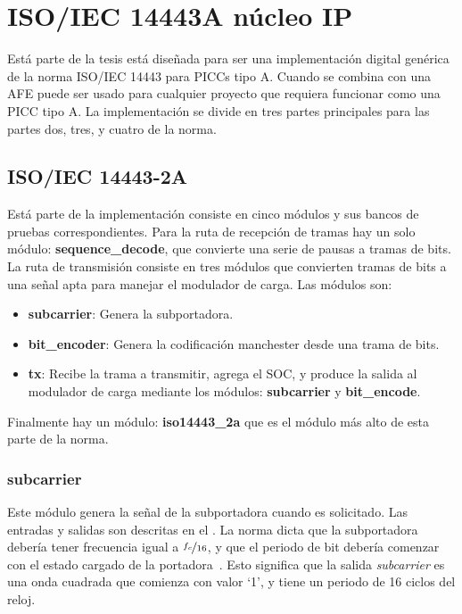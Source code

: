 \documentclass[a4paper, twoside, 11pt]{report}
\begin{document}
\FloatBarrier
\section{ISO/IEC 14443A núcleo IP}

Está parte de la tesis está diseñada para ser una implementación digital genérica de la norma ISO/IEC 14443 para PICCs tipo A. Cuando se combina con una AFE puede ser usado para cualquier proyecto que requiera funcionar como una PICC tipo A. La implementación  se divide en tres partes principales para las partes dos, tres, y cuatro de la norma.

\FloatBarrier
\subsection{ISO/IEC 14443-2A}

Está parte de la implementación consiste en cinco módulos y sus bancos de pruebas correspondientes. Para la ruta de recepción de tramas hay un solo módulo: \textbf{sequence\_decode}, que convierte una serie de pausas a tramas de bits. La ruta de transmisión consiste en tres módulos que convierten tramas de bits a una señal apta para manejar el modulador de carga. Las módulos son:

\begin{itemize}
  \item \textbf{subcarrier}: Genera la subportadora.
  \item \textbf{bit\_encoder}: Genera la codificación manchester desde una trama de bits.
  \item \textbf{tx}: Recibe la trama a transmitir, agrega el SOC, y produce la salida al modulador de carga mediante los módulos: \textbf{subcarrier} y \textbf{bit\_encode}.
\end{itemize}

Finalmente hay un módulo: \textbf{iso14443\_2a} que es el módulo más alto de esta parte de la norma.

\FloatBarrier
\subsubsection{subcarrier}

Este módulo genera la señal de la subportadora cuando es solicitado. Las entradas y salidas son descritas en el . La norma dicta que la subportadora debería tener frecuencia igual a $\nicefrac{f_c}{16}$, y que el periodo de bit debería comenzar con el estado cargado de la portadora~\cite{iso14443-2}. Esto significa que la salida \textit{subcarrier} es una onda cuadrada que comienza con valor ‘1’, y tiene un periodo de 16 ciclos del reloj.
\end{document}
